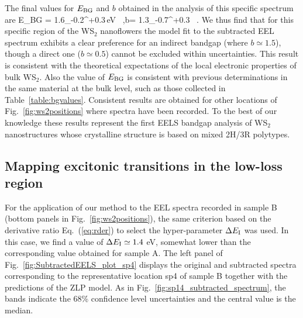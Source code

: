 The final values for $E_{\rm BG}$ and $b$ obtained in the analysis of this specific spectrum are
\be
E_{\rm BG} = 1.6_{-0.2}^{+0.3}\,{\rm eV} \, ,\quad b= 1.3_{-0.7}^{+0.3} \, .
\ee
We thus find that for this specific region of the WS$_2$ nanoflowers
the model fit to the subtracted EEL spectrum exhibits a clear preference
for an indirect bandgap (where $b\simeq 1.5$), though a direct one ($b\simeq 0.5$)
cannot be excluded within uncertainties.
%
This result is consistent with the theoretical expectations of the local
electronic properties of bulk WS$_2$.
%
Also the value of $E_{\rm BG}$ is consistent with previous determinations
in the same material at the bulk level, such as those collected in Table~\ref{table:bgvalues}.
%
Consistent results are obtained for other locations of Fig.~\ref{fig:ws2positions}
where spectra have been recorded.
%
To the best of our knowledge
these results represent the first EELS bandgap analysis of WS$_2$ nanostructures
whose crystalline structure is based on mixed 2H/3R polytypes.

\subsection{Mapping excitonic transitions in the low-loss region}

For the application of our method to the EEL spectra recorded in sample B (bottom panels
in  Fig.~\ref{fig:ws2positions}), the same criterion
based on the derivative ratio Eq.~(\ref{eq:rder}) to select the hyper-parameter $\Delta E_{\rm I}$ was
used.
%
In this case, we find a value of $\Delta E_{\rm I}\simeq 1.4$ eV,
 somewhat lower than the corresponding value obtained for sample A.
%
The left panel of Fig.~\ref{fig:SubtractedEELS_plot_sp4} displays
the original
and subtracted spectra corresponding to the representative
location sp4 of sample B
together with the predictions of the ZLP model.
%
As in Fig.~\ref{fig:sp14_subtracted_spectrum}, the bands indicate the 68\% confidence level uncertainties
and the central value is the median.

